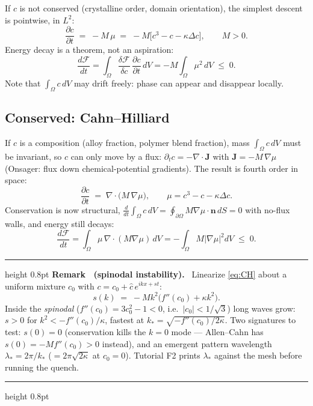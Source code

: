 \documentclass[11pt]{article}
\newcounter{remark}
\newenvironment{remark}[1]{%
  \refstepcounter{remark}\par\medskip
  \noindent\begin{minipage}{\linewidth}
  \hrule height 0.8pt \smallskip
  \textbf{Remark \theremark\ (#1).}\ }{%
  \smallskip\hrule height 0.8pt \end{minipage}\par\medskip}
\newcommand{\diff}[2]{\frac{\partial #1}{\partial #2}}
\newcommand{\vd}[2]{\frac{\delta #1}{\delta #2}}
\begin{document}
If $c$ is not conserved (crystalline order, domain orientation), the
simplest descent is pointwise, in $L^2$:
\begin{equation}
  \diff{c}{t} \;=\; -M\,\mu \;=\; -M\big[c^3 - c - \kappa \Delta c\big],
  \qquad M>0 .
  \label{eq:AC}
\end{equation}
Energy decay is a theorem, not an aspiration:
\begin{equation}
  \frac{d\mathcal{F}}{dt}
  = \int_\Omega \vd{\mathcal{F}}{c}\,\diff{c}{t}\, dV
  = -M \int_\Omega \mu^2 \, dV \;\le\; 0 .
  \label{eq:ACdecay}
\end{equation}
Note that $\int_\Omega c\, dV$ may drift freely: phase can appear and
disappear locally.

\subsection{Conserved: Cahn--Hilliard}

If $c$ is a composition (alloy fraction, polymer blend fraction), mass
$\int_\Omega c\,dV$ must be invariant, so $c$ can only move by a flux:
$\partial_t c = -\nabla\cdot \mathbf{J}$ with
$\mathbf{J} = -M\,\nabla\mu$ (Onsager: flux down chemical-potential
gradients). The result is fourth order in space:
\begin{equation}
  \diff{c}{t} \;=\; \nabla \cdot \big( M\, \nabla \mu \big),
  \qquad
  \mu = c^3 - c - \kappa \Delta c .
  \label{eq:CH}
\end{equation}
Conservation is now structural,
$\frac{d}{dt}\int_\Omega c \, dV = \oint_{\partial\Omega} M \nabla\mu
\cdot \mathbf{n}\, dS = 0$ with no-flux walls, and energy still decays:
\begin{equation}
  \frac{d\mathcal{F}}{dt}
  = \int_\Omega \mu \, \nabla\cdot(M\nabla\mu)\, dV
  = -\int_\Omega M \lvert \nabla\mu \rvert^2 dV \;\le\; 0 .
  \label{eq:CHdecay}
\end{equation}

\begin{remark}{spinodal instability}
Linearize \eqref{eq:CH} about a uniform mixture $c_0$ with
$c = c_0 + \hat c\, e^{i k x + s t}$:
\begin{equation}
  s(k) \;=\; -M k^2 \big( f''(c_0) + \kappa k^2 \big).
\end{equation}
Inside the \emph{spinodal} ($f''(c_0) = 3c_0^2 - 1 < 0$, i.e.\
$\lvert c_0\rvert < 1/\sqrt3$) long waves grow: $s>0$ for
$k^2 < -f''(c_0)/\kappa$, fastest at $k_* = \sqrt{-f''(c_0)/2\kappa}$.
Two signatures to test: $s(0) = 0$ (conservation kills the $k=0$ mode
--- Allen--Cahn has $s(0) = -Mf''(c_0) > 0$ instead), and an emergent
pattern wavelength $\lambda_* = 2\pi/k_*$ ($= 2\pi\sqrt{2\kappa}$ at
$c_0 = 0$). Tutorial F2 prints $\lambda_*$ against the mesh before
running the quench.
\end{remark}
\end{document}
